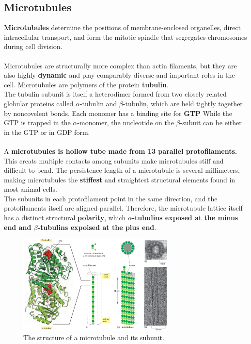 \documentclass[../main.tex]{subfiles}
\begin{document}
\subsection{Microtubules}
\textbf{Microtubules} determine the positions of membrane-enclosed organelles, direct intracellular transport, and form the mitotic spindle that segregates chromosomes during cell division.\\
\\
Microtubules are structurally more complex than actin filaments, but they are also highly \textbf{dynamic} and play comparably diverse and important roles in the cell. Microtubules are polymers of the protein \textbf{\gls{tubulin}}.  \\
\indent The tubulin subunit is itself a heterodimer formed from two closely related globular proteins called $\alpha$-tubulin and $\beta$-tubulin, which are held tightly together by noncovelent bonds.  Each monomer has a binding site for \textbf{GTP} While the GTP is trapped in the $\alpha$-monomer, the nucleotide on the $\beta$-subuit can be either in the GTP or in GDP form. \\
\\
A \textbf{\gls{microtubules} is hollow tube made from 13 parallel protofilaments.} This creats multiple contacts among subunits make microtubules stiff and difficult to bend. The persistence length of a microtubule is several millimeters, making microtubules the \textbf{stiffest} and straightest structural elements found in most animal cells. \\
\indent The subunits in each protofilament point in the same direction, and the protofilaments itself are aligned parallel. Therefore, the microtubule lattice itself has a distinct structural \textbf{polarity}, which \textbf{$\alpha$-tubulins exposed at the minus end and $\beta$-tubulins expoised at the plus end}. 
\begin{figure}[H]
	\centering
	\includegraphics[width = 0.7\textwidth]{21}
	\caption{The structure of a microtubule and its subunit.}
\end{figure}
\end{document}
